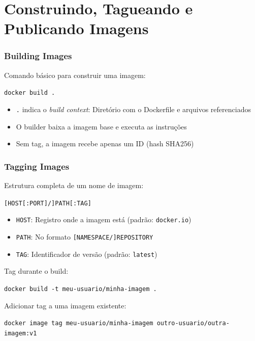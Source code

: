 \section{Construindo, Tagueando e Publicando Imagens}

\begin{frame}
  \frametitle{Building Images}
  Comando básico para construir uma imagem:

  \vspace{0.3em}
  \texttt{docker build .}

  \vspace{0.5em}
  \begin{itemize}
    \item \texttt{.} indica o \textit{build context}: Diretório com o Dockerfile e arquivos referenciados
    \item O builder baixa a imagem base e executa as instruções
    \item Sem tag, a imagem recebe apenas um ID (hash SHA256)
  \end{itemize}
\end{frame}

\begin{frame}
  \frametitle{Tagging Images}
  Estrutura completa de um nome de imagem:

  \vspace{0.3em}
  \texttt{[HOST[:PORT]/]PATH[:TAG]}

  \vspace{0.5em}
  \begin{itemize}
    \item \texttt{HOST}: Registro onde a imagem está (padrão: \texttt{docker.io})
    \item \texttt{PATH}: No formato \texttt{[NAMESPACE/]REPOSITORY}
    \item \texttt{TAG}: Identificador de versão (padrão: \texttt{latest})
  \end{itemize}

  \vspace{0.5em}
  Tag durante o build:

  \vspace{0.3em}
  \texttt{docker build -t meu-usuario/minha-imagem .}

  \vspace{0.5em}
  Adicionar tag a uma imagem existente:

  \vspace{0.3em}
  \texttt{docker image tag meu-usuario/minha-imagem outro-usuario/outra-imagem:v1}
\end{frame}

